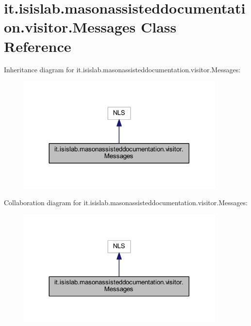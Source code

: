 \hypertarget{classit_1_1isislab_1_1masonassisteddocumentation_1_1visitor_1_1_messages}{\section{it.\-isislab.\-masonassisteddocumentation.\-visitor.\-Messages Class Reference}
\label{classit_1_1isislab_1_1masonassisteddocumentation_1_1visitor_1_1_messages}
}


Inheritance diagram for it.\-isislab.\-masonassisteddocumentation.\-visitor.\-Messages\-:\nopagebreak
\begin{figure}[H]
\begin{center}
\leavevmode
\includegraphics[width=296pt]{classit_1_1isislab_1_1masonassisteddocumentation_1_1visitor_1_1_messages__inherit__graph}
\end{center}
\end{figure}


Collaboration diagram for it.\-isislab.\-masonassisteddocumentation.\-visitor.\-Messages\-:\nopagebreak
\begin{figure}[H]
\begin{center}
\leavevmode
\includegraphics[width=296pt]{classit_1_1isislab_1_1masonassisteddocumentation_1_1visitor_1_1_messages__coll__graph}
\end{center}
\end{figure}
